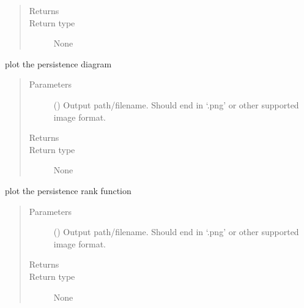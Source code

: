 \documentclass[letterpaper,10pt,openany,oneside,english]{sphinxmanual}
\begin{document}
\begin{fulllineitems}
\begin{fulllineitems}
\begin{quote}
\begin{description}
\begin{itemize}
\end{itemize}

\item[{Returns}] \leavevmode


\item[{Return type}] \leavevmode
None

\end{description}\end{quote}

\end{fulllineitems}


\begin{fulllineitems}
\label{\detokenize{phomology:phomology.Filtration.plot_pd}}
plot the persistence diagram
\begin{quote}\begin{description}
\item[{Parameters}] \leavevmode
{} () \textendash{} Output path/filename. Should end in ‘.png’ or other supported image
format.

\item[{Returns}] \leavevmode


\item[{Return type}] \leavevmode
None

\end{description}\end{quote}

\end{fulllineitems}


\begin{fulllineitems}
\label{\detokenize{phomology:phomology.Filtration.plot_prf}}
plot the persistence rank function
\begin{quote}\begin{description}
\item[{Parameters}] \leavevmode
{} () \textendash{} Output path/filename. Should end in ‘.png’ or other supported image
format.

\item[{Returns}] \leavevmode


\item[{Return type}] \leavevmode
None


\end{description}
\end{quote}
\end{fulllineitems}
\end{fulllineitems}
\end{document}
